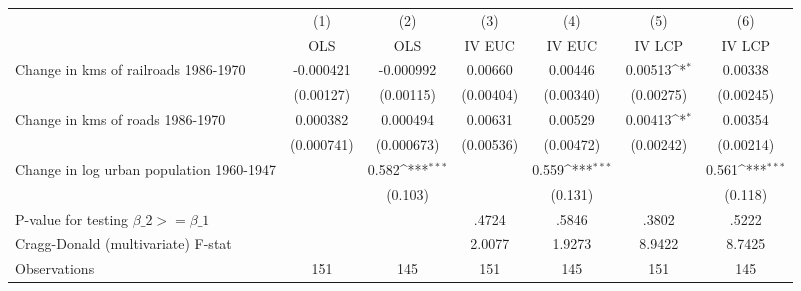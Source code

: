 {
\def\sym#1{\ifmmode^{#1}\else\(^{#1}\)\fi}
\begin{tabular}{l*{6}{c}}
\hline\hline
                &\multicolumn{1}{c}{(1)}&\multicolumn{1}{c}{(2)}&\multicolumn{1}{c}{(3)}&\multicolumn{1}{c}{(4)}&\multicolumn{1}{c}{(5)}&\multicolumn{1}{c}{(6)}\\
                &\multicolumn{1}{c}{OLS}&\multicolumn{1}{c}{OLS}&\multicolumn{1}{c}{IV EUC}&\multicolumn{1}{c}{IV EUC}&\multicolumn{1}{c}{IV LCP}&\multicolumn{1}{c}{IV LCP}\\
\hline
Change in kms of railroads 1986-1970&-0.000421         &-0.000992         &  0.00660         &  0.00446         &  0.00513\sym{*}  &  0.00338         \\
                &(0.00127)         &(0.00115)         &(0.00404)         &(0.00340)         &(0.00275)         &(0.00245)         \\
[1em]
Change in kms of roads 1986-1970& 0.000382         & 0.000494         &  0.00631         &  0.00529         &  0.00413\sym{*}  &  0.00354         \\
                &(0.000741)         &(0.000673)         &(0.00536)         &(0.00472)         &(0.00242)         &(0.00214)         \\
[1em]
Change in log urban population 1960-1947&                  &    0.582\sym{***}&                  &    0.559\sym{***}&                  &    0.561\sym{***}\\
                &                  &  (0.103)         &                  &  (0.131)         &                  &  (0.118)         \\
\hline
P-value for testing $\beta\_{2} >= \beta\_{1}$&                  &                  &    .4724         &    .5846         &    .3802         &    .5222         \\
Cragg-Donald (multivariate) F-stat&                  &                  &   2.0077         &   1.9273         &   8.9422         &   8.7425         \\
Observations    &      151         &      145         &      151         &      145         &      151         &      145         \\
\hline\hline
\end{tabular}
}
